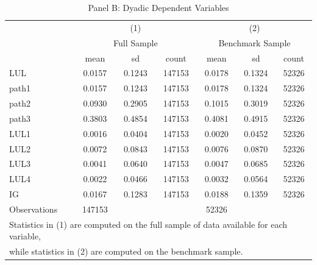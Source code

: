 \begin{table}[htbp]\centering
\def\sym#1{\ifmmode^{#1}\else\(^{#1}\)\fi}
\caption{Panel B: Dyadic Dependent Variables}
\begin{tabular}{l*{2}{ccc}}
\toprule
                    &\multicolumn{3}{c}{(1)}               &\multicolumn{3}{c}{(2)}               \\
                    &\multicolumn{3}{c}{Full Sample}       &\multicolumn{3}{c}{Benchmark Sample}  \\
                    &        mean&          sd&       count&        mean&          sd&       count\\
\midrule
LUL                 &      0.0157&      0.1243&      147153&      0.0178&      0.1324&       52326\\
path1               &      0.0157&      0.1243&      147153&      0.0178&      0.1324&       52326\\
path2               &      0.0930&      0.2905&      147153&      0.1015&      0.3019&       52326\\
path3               &      0.3803&      0.4854&      147153&      0.4081&      0.4915&       52326\\
LUL1                &      0.0016&      0.0404&      147153&      0.0020&      0.0452&       52326\\
LUL2                &      0.0072&      0.0843&      147153&      0.0076&      0.0870&       52326\\
LUL3                &      0.0041&      0.0640&      147153&      0.0047&      0.0685&       52326\\
LUL4                &      0.0022&      0.0466&      147153&      0.0032&      0.0564&       52326\\
IG                  &      0.0167&      0.1283&      147153&      0.0188&      0.1359&       52326\\
\midrule
Observations        &      147153&            &            &       52326&            &            \\
\bottomrule
\multicolumn{7}{l}{\footnotesize Statistics in (1) are computed on the full sample of data available for each variable,}\\
\multicolumn{7}{l}{\footnotesize while statistics in (2) are computed on the benchmark sample.}\\
\end{tabular}
\end{table}
